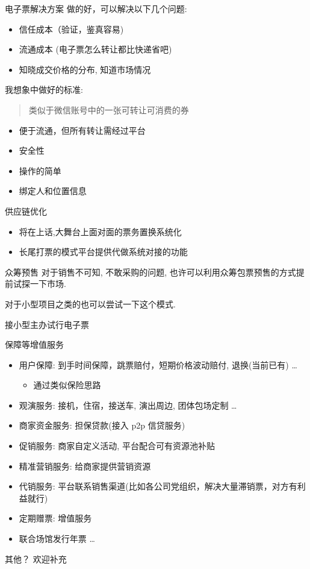 \documentclass[presentation,bigger]{beamer}
\begin{document}
\begin{frame}[label={sec:org6e1f05a}]{电子票解决方案}
做的好，可以解决以下几个问题:

\begin{itemize}
\item 信任成本（验证，鉴真容易)
\item 流通成本 (电子票怎么转让都比快递省吧)
\item 知晓成交价格的分布, 知道市场情况
\end{itemize}

我想象中做好的标准:
\begin{quote}
类似于微信账号中的一张可转让可消费的券
\end{quote}
\begin{itemize}
\item 便于流通，但所有转让需经过平台
\item 安全性
\item 操作的简单
\item 绑定人和位置信息
\end{itemize}
\end{frame}

\begin{frame}[label={sec:orgeb97c21}]{供应链优化}
\begin{itemize}
\item 将在上话,大舞台上面对面的票务置换系统化
\item 长尾打票的模式平台提供代做系统对接的功能
\end{itemize}
\end{frame}

\begin{frame}[label={sec:org647ce00}]{众筹预售}
对于销售不可知, 不敢采购的问题, 也许可以利用众筹包票预售的方式提前试探一下市场.

对于小型项目之类的也可以尝试一下这个模式.
\end{frame}

\begin{frame}[label={sec:orgfa0438d}]{接小型主办试行电子票}
\end{frame}

\begin{frame}[label={sec:org471f12e}]{保障等增值服务}
\begin{itemize}
\item 用户保障: 到手时间保障，跳票赔付，短期价格波动赔付, 退换(当前已有) \dots{}
\begin{itemize}
\item 通过类似保险思路
\end{itemize}
\item 观演服务: 接机，住宿，接送车, 演出周边, 团体包场定制 \dots{}
\item 商家资金服务: 担保贷款(接入 p2p 信贷服务)
\item 促销服务: 商家自定义活动, 平台配合可有资源池补贴
\item 精准营销服务: 给商家提供营销资源
\item 代销服务: 平台联系销售渠道(比如各公司党组织，解决大量滞销票，对方有利益就行)
\item 定期赠票: 增值服务
\item 联合场馆发行年票 \dots{}
\end{itemize}
\end{frame}

\begin{frame}[label={sec:orgfe1285c}]{其他？}
欢迎补充
\end{frame}
\end{document}
